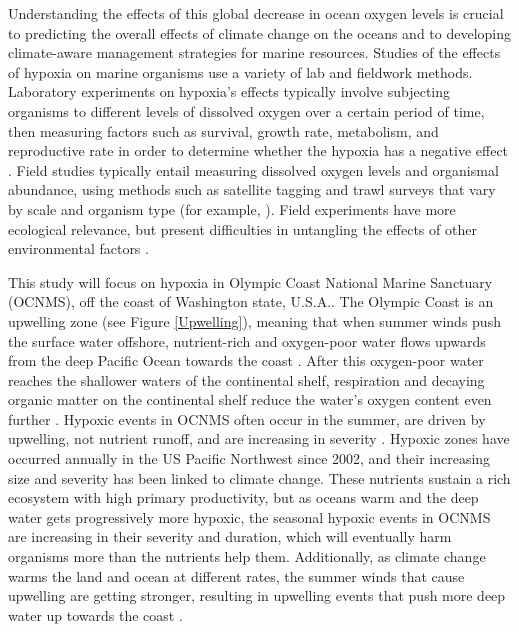\documentclass[12pt,twoside]{reedthesis}
\begin{document}
Understanding the effects of this global decrease in ocean oxygen levels is crucial to predicting the overall effects of climate change on the oceans and to developing climate-aware management strategies for marine resources. Studies of the effects of hypoxia on marine organisms use a variety of lab and fieldwork methods. Laboratory experiments on hypoxia's effects typically involve subjecting organisms to different levels of dissolved oxygen over a certain period of time, then measuring factors such as survival, growth rate, metabolism, and reproductive rate in order to determine whether the hypoxia has a negative effect \autocite{Steckbauer2020}. Field studies typically entail measuring dissolved oxygen levels and organismal abundance, using methods such as satellite tagging and trawl surveys that vary by scale and organism type (for example, \autocite{Keister2020}). Field experiments have more ecological relevance, but present difficulties in untangling the effects of other environmental factors \autocite{Borges2022, Boyd2018}. 

This study will focus on hypoxia in Olympic Coast National Marine Sanctuary (OCNMS), off the coast of Washington state, U.S.A.. The Olympic Coast is an upwelling zone (see Figure \ref{Upwelling}), meaning that when summer winds push the surface water offshore, nutrient-rich and oxygen-poor water flows upwards from the deep Pacific Ocean towards the coast \autocite{OceanographyOlympicCoast, Hickey2003}. After this oxygen-poor water reaches the shallower waters of the continental shelf, respiration and decaying organic matter on the continental shelf reduce the water's oxygen content even further \autocite{Pierce2012}. Hypoxic events in OCNMS often occur in the summer, are driven by upwelling, not nutrient runoff, and are increasing in severity \autocite{Barth2024}. Hypoxic zones have occurred annually in the US Pacific Northwest since 2002, and their increasing size and severity has been linked to climate change. These nutrients sustain a rich ecosystem with high primary productivity, but as oceans warm and the deep water gets progressively more hypoxic, the seasonal hypoxic events in OCNMS are increasing in their severity and duration, which will eventually harm organisms more than the nutrients help them. Additionally, as climate change warms the land and ocean at different rates, the summer winds that cause upwelling are getting stronger, resulting in upwelling events that push more deep water up towards the coast \autocite{Barth2024}. 
\end{document}
